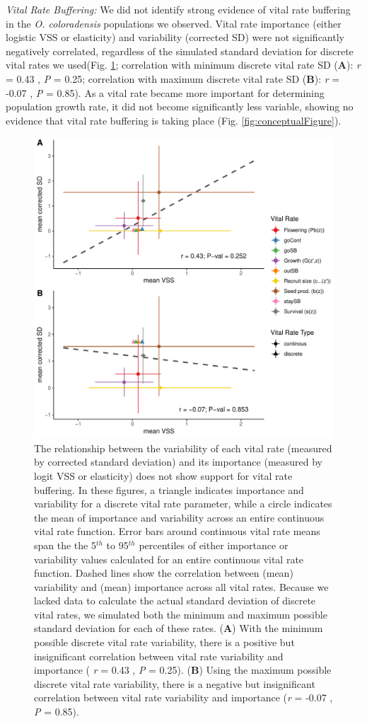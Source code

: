 \documentclass[12pt, letterpaper]{article}
\begin{document}
\textit{Vital Rate Buffering:} We did not identify strong evidence of vital rate buffering in the \textit{O. coloradensis} populations we observed. 
Vital rate importance (either logistic VSS or elasticity) and variability (corrected SD) were not significantly negatively correlated, regardless of the simulated standard deviation for discrete vital rates we used(Fig. \ref{fig:VRBuffering}; correlation with minimum discrete vital rate SD (\textbf{A}): \textit{r} = 0.43 , \textit{P} = 0.25; correlation with maximum discrete vital rate SD (\textbf{B}): \textit{r} = -0.07 , \textit{P} = 0.85). As a vital rate became more important for determining population growth rate, it did not become significantly less variable, showing no evidence that vital rate buffering is taking place (Fig. \ref{fig:conceptualFigure}).  

\begin{figure}[h]
  \centering
  \includegraphics[width=.7\textwidth]{figures/VRbufferingFigure.pdf}
  \caption{The relationship between the variability of each vital rate (measured by corrected standard deviation) and its importance (measured by logit VSS or elasticity) does not show support for vital rate buffering. In these figures, a triangle indicates importance and variability for a discrete vital rate parameter, while a circle indicates the mean of importance and variability across an entire continuous vital rate function. Error bars around continuous vital rate means span the the 5$^{th}$ to 95$^{th}$ percentiles of either importance or variability values calculated for an entire continuous vital rate function. Dashed lines show the correlation between (mean) variability and (mean) importance across all vital rates. Because we lacked data to calculate the actual standard deviation of discrete vital rates, we simulated both the minimum and maximum possible standard deviation for each of these rates. (\textbf{A}) With the minimum possible discrete vital rate variability, there is a positive but insignificant correlation between vital rate variability and importance ( \textit{r} = 0.43 , \textit{P} = 0.25). (\textbf{B}) Using the maximum possible discrete vital rate variability, there is a negative but insignificant correlation between vital rate variability and importance (\textit{r} = -0.07 , \textit{P} = 0.85).}
  \label{fig:VRBuffering}
\end{figure} 
\end{document}
